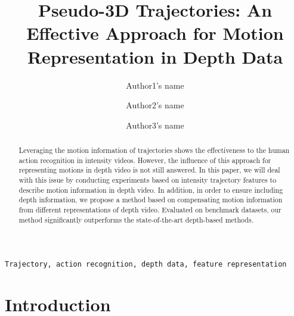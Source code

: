 \documentclass[review]{elsarticle}
\begin{document}
\begin{frontmatter}

\title{Pseudo-3D Trajectories: An Effective Approach for Motion Representation in Depth Data}




\author{Author1's name}
\address{Adress 1}

\author{Author2's name}
\address{Adress 2}

\author{Author3's name}
\address{Adress 3}


\begin{abstract}
Leveraging the motion information of trajectories shows the effectiveness to the human action recognition in intensity videos. However, the influence of this approach for representing motions in depth video is not still answered. In this paper, we will deal with this issue by conducting experiments based on intensity trajectory features to describe motion information in depth video. In addition, in order to ensure including depth information, we propose a method based on compensating motion information from different representations of depth video. Evaluated on benchmark datasets, our method significantly outperforms the state-of-the-art depth-based methods.
\end{abstract}

\begin{keyword}
\texttt{Trajectory, action recognition, depth data, feature representation}
\end{keyword}

\end{frontmatter}

\linenumbers

\section{Introduction}
\end{document}

